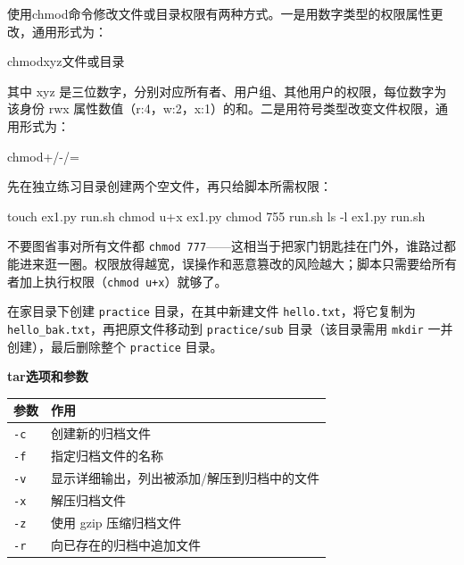 使用chmod命令修改文件或目录权限有两种方式。一是用数字类型的权限属性更改，通用形式为：

chmod\enspace [-R]\enspace xyz\enspace 文件或目录

其中 xyz 是三位数字，分别对应所有者、用户组、其他用户的权限，每位数字为该身份 rwx 属性数值（r:4，w:2，x:1）的和。二是用符号类型改变文件权限，通用形式为：

chmod\enspace [身份]\enspace +/-/=\enspace [permissions]

\begin{example}
先在独立练习目录创建两个空文件，再只给脚本所需权限：


\begin{tbash}
touch ex1.py run.sh
chmod u+x ex1.py
chmod 755 run.sh
ls -l ex1.py run.sh
\end{tbash}


\end{example}

\begin{note}
不要图省事对所有文件都 \texttt{chmod 777}——这相当于把家门钥匙挂在门外，谁路过都能进来逛一圈。权限放得越宽，误操作和恶意篡改的风险越大；脚本只需要给所有者加上执行权限（\texttt{chmod u+x}）就够了。
\end{note}

\begin{exercise}\label{ex:v1-file-ops}
在家目录下创建 \texttt{practice} 目录，在其中新建文件 \texttt{hello.txt}，将它复制为 \texttt{hello\_bak.txt}，再把原文件移动到 \texttt{practice/sub} 目录（该目录需用 \texttt{mkdir} 一并创建），最后删除整个 \texttt{practice} 目录。
\end{exercise}


\begin{table}[H]\centering
\textbf{tar\enspace 选项和参数}

	\begin{tabular}{p{}p{}}
		\toprule[1.5pt]
		参数 & 作用\\
		\midrule[1pt]
		\texttt{-c}		&创建新的归档文件\\
		\texttt{-f}		&指定归档文件的名称\\
		\texttt{-v}		&显示详细输出，列出被添加/解压到归档中的文件 \\
		\texttt{-x}		&解压归档文件 \\
		\texttt{-z}		&使用 gzip 压缩归档文件 \\
		\texttt{-r}		&向已存在的归档中追加文件 \\
		\bottomrule[1.5pt]
	\end{tabular}
\end{table}



